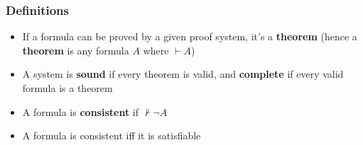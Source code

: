 \documentclass[a4paper, 12pt]{article}
\begin{document}
        \subsubsection*{Definitions}
        \begin{itemize}
            \item If a formula can be proved by a given proof system, it's a \textbf{theorem} (hence a \textbf{theorem} is any formula $A$ where $\vdash A$)
            \item A system is \textbf{sound} if every theorem is valid, and \textbf{complete} if every valid formula is a theorem
            \item A formula is \textbf{consistent} if $\nvdash \neg A$
            \item A formula is consistent iff it is satisfiable
        \end{itemize}
    
\end{document}
